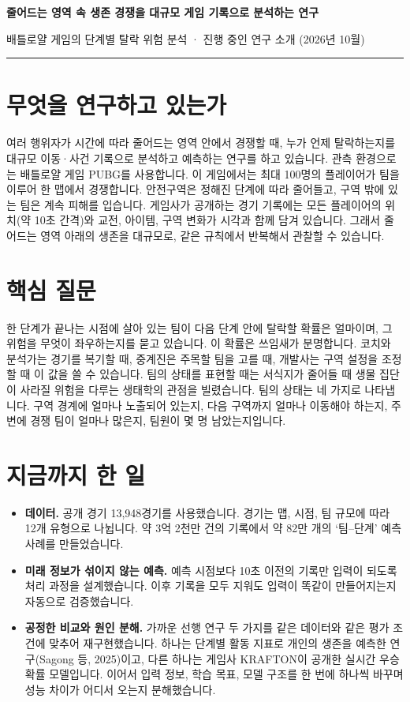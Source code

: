 \documentclass[10pt,a4paper]{article}
\begin{document}
{\Large\bfseries 줄어드는 영역 속 생존 경쟁을 대규모 게임 기록으로 분석하는 연구\par}
\vspace{3pt}
{\normalsize 배틀로얄 게임의 단계별 탈락 위험 분석 · 진행 중인 연구 소개 (2026년 10월)\par}
\vspace{3pt}
{\color{accent}\rule{\linewidth}{0.8pt}}

\section{무엇을 연구하고 있는가}
여러 행위자가 시간에 따라 줄어드는 영역 안에서 경쟁할 때, 누가 언제 탈락하는지를 대규모 이동·사건 기록으로 분석하고 예측하는 연구를 하고 있습니다.
관측 환경으로는 배틀로얄 게임 PUBG를 사용합니다.
이 게임에서는 최대 100명의 플레이어가 팀을 이루어 한 맵에서 경쟁합니다.
안전구역은 정해진 단계에 따라 줄어들고, 구역 밖에 있는 팀은 계속 피해를 입습니다.
게임사가 공개하는 경기 기록에는 모든 플레이어의 위치(약 10초 간격)와 교전, 아이템, 구역 변화가 시각과 함께 담겨 있습니다.
그래서 줄어드는 영역 아래의 생존을 대규모로, 같은 규칙에서 반복해서 관찰할 수 있습니다.

\section{핵심 질문}
한 단계가 끝나는 시점에 살아 있는 팀이 다음 단계 안에 탈락할 확률은 얼마이며, 그 위험을 무엇이 좌우하는지를 묻고 있습니다.
이 확률은 쓰임새가 분명합니다. 코치와 분석가는 경기를 복기할 때, 중계진은 주목할 팀을 고를 때, 개발사는 구역 설정을 조정할 때 이 값을 쓸 수 있습니다.
팀의 상태를 표현할 때는 서식지가 줄어들 때 생물 집단이 사라질 위험을 다루는 생태학의 관점을 빌렸습니다.
팀의 상태는 네 가지로 나타냅니다. 구역 경계에 얼마나 노출되어 있는지, 다음 구역까지 얼마나 이동해야 하는지, 주변에 경쟁 팀이 얼마나 많은지, 팀원이 몇 명 남았는지입니다.

\section{지금까지 한 일}
\begin{itemize}
  \item \textbf{데이터.} 공개 경기 13,948경기를 사용했습니다. 경기는 맵, 시점, 팀 규모에 따라 12개 유형으로 나뉩니다. 약 3억 2천만 건의 기록에서 약 82만 개의 `팀--단계' 예측 사례를 만들었습니다.
  \item \textbf{미래 정보가 섞이지 않는 예측.} 예측 시점보다 10초 이전의 기록만 입력이 되도록 처리 과정을 설계했습니다. 이후 기록을 모두 지워도 입력이 똑같이 만들어지는지 자동으로 검증했습니다.
  \item \textbf{공정한 비교와 원인 분해.} 가까운 선행 연구 두 가지를 같은 데이터와 같은 평가 조건에 맞추어 재구현했습니다. 하나는 단계별 활동 지표로 개인의 생존을 예측한 연구(Sagong 등, 2025)이고, 다른 하나는 게임사 KRAFTON이 공개한 실시간 우승확률 모델입니다. 이어서 입력 정보, 학습 목표, 모델 구조를 한 번에 하나씩 바꾸며 성능 차이가 어디서 오는지 분해했습니다.
\end{itemize}
\end{document}
